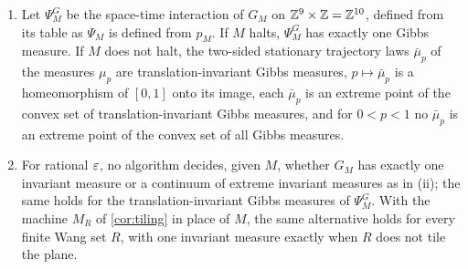 \begin{corollary}
\begin{enumerate}[label=\textup{(\roman*)}]
\begin{itemize}
\end{itemize}
\item Let $\Psi^G_M$ be the space-time interaction of $G_M$ on $\mathbb{Z}^9\times\mathbb{Z}=\mathbb{Z}^{10}$, defined from its table as $\Psi_M$ is defined from $p_M$. If $M$ halts, $\Psi^G_M$ has exactly one Gibbs measure. If $M$ does not halt, the two-sided stationary trajectory laws $\bar\mu_p$ of the measures $\mu_p$ are translation-invariant Gibbs measures, $p\mapsto\bar\mu_p$ is a homeomorphism of $[0,1]$ onto its image, each $\bar\mu_p$ is an extreme point of the convex set of translation-invariant Gibbs measures, and for $0<p<1$ no $\bar\mu_p$ is an extreme point of the convex set of all Gibbs measures.
\item For rational $\varepsilon$, no algorithm decides, given $M$, whether $G_M$ has exactly one invariant measure or a continuum of extreme invariant measures as in (ii); the same holds for the translation-invariant Gibbs measures of $\Psi^G_M$. With the machine $M_R$ of \cref{cor:tiling} in place of $M$, the same alternative holds for every finite Wang set $R$, with one invariant measure exactly when $R$ does not tile the plane.
\end{enumerate}
\end{corollary}

